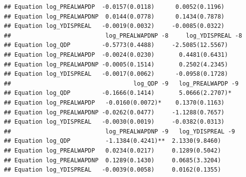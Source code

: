 \documentclass[11pt,preprint, authoryear]{elsarticle}
\numberwithin{equation}{section}
\numberwithin{figure}{section}
\numberwithin{table}{section}
\begin{document}
\begin{verbatim}
## Equation log_PREALWAPDP  -0.0157(0.0118)      0.0052(0.1196)    
## Equation log_PREALWAPDNP  0.0144(0.0778)      0.1434(0.7878)    
## Equation log_YDISPREAL   -0.0019(0.0032)     -0.0085(0.0322)    
##                           log_PREALWAPDNP -8     log_YDISPREAL -8
## Equation log_QDP         -0.5773(0.4488)     -2.5085(12.5567)    
## Equation log_PREALWAPDP  -0.0024(0.0230)       0.4481(0.6431)    
## Equation log_PREALWAPDNP -0.0005(0.1514)       0.2502(4.2345)    
## Equation log_YDISPREAL   -0.0017(0.0062)      -0.0958(0.1728)    
##                                   log_QDP -9   log_PREALWAPDP -9
## Equation log_QDP         -0.1666(0.1414)       5.0666(2.2707)*  
## Equation log_PREALWAPDP   -0.0160(0.0072)*    0.1370(0.1163)    
## Equation log_PREALWAPDNP -0.0262(0.0477)     -1.1288(0.7657)    
## Equation log_YDISPREAL   -0.0030(0.0019)     -0.0382(0.0313)    
##                           log_PREALWAPDNP -9   log_YDISPREAL -9
## Equation log_QDP          -1.1384(0.4241)**  2.1330(9.8460)    
## Equation log_PREALWAPDP   0.0234(0.0217)     0.1289(0.5042)    
## Equation log_PREALWAPDNP  0.1289(0.1430)     0.0685(3.3204)    
## Equation log_YDISPREAL   -0.0039(0.0058)     0.0162(0.1355)
\end{verbatim}


\end{document}
